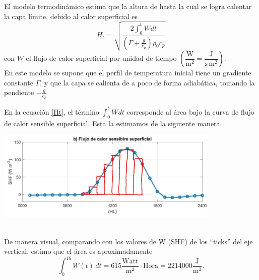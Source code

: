 \documentclass[../main.tex]{subfiles}
\begin{document}
    El modelo termodinámico estima que la altura de hasta la cual se logra calentar la capa límite, debido al calor superficial es
    \begin{equation}
        H_t = \sqrt{ \frac{2 \int_0^{t} W dt}{ \left( \Gamma + \frac{g}{c_p} \right) \rho_0 c_p}   }  \label{Ht}
    \end{equation}
    con $W$ el flujo de calor superficial por unidad de tiempo $\left(\dfrac{\text{W}}{\text{m}^2} = \dfrac{\text{J}}{\text{s}\,\text{m}^2}\right)$.\\

En este modelo se supone que el perfil de temperatura inicial tiene un gradiente constante $\Gamma$, y que la capa se calienta de a poco de forma adiabática, tomando la pendiente $-\frac{g}{c_p}$

En la ecuación \eqref{Ht}, el término $\int_0^{t} W dt$ corresponde al área bajo la curva de flujo de calor sensible superficial. Esta la estimamos de la siguiente manera.

\begin{minipage}{\linewidth}
    \centering
    \includegraphics[width=0.8\textwidth]{img/area_WT}
    \label{aWT}
\end{minipage}\\

De manera visual, comparando con los valores de W (SHF) de los ``ticks'' del eje vertical, estimo que el área es aproximadamente 
\begin{equation}
    \int_0^{16} W(t)\, dt = 615 \frac{\text{Watt}}{\text{m}^2}\cdot \text{Hora} = 2214000 \dfrac{\text{J}}{\text{m}^2}.
\end{equation}
\end{document}
